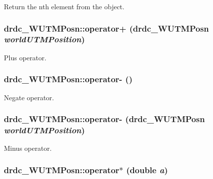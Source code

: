 Return the nth element from the object. 

\hypertarget{classdrdc__WUTMPosn_243334e7b04a731573a2d2fc875377b6}{
\subsubsection[operator+]{ drdc\_\-WUTMPosn::operator+ ({\bf drdc\_\-WUTMPosn} {\em worldUTMPosition})}}
\label{classdrdc__WUTMPosn_243334e7b04a731573a2d2fc875377b6}


Plus operator. 

\hypertarget{classdrdc__WUTMPosn_54f6cc02b2435080a081ad979cf36480}{
\subsubsection[operator-]{ drdc\_\-WUTMPosn::operator- ()}}
\label{classdrdc__WUTMPosn_54f6cc02b2435080a081ad979cf36480}


Negate operator. 

\hypertarget{classdrdc__WUTMPosn_94275ec1d96ae6a0e1740346e79c6a14}{
\subsubsection[operator-]{ drdc\_\-WUTMPosn::operator- ({\bf drdc\_\-WUTMPosn} {\em worldUTMPosition})}}
\label{classdrdc__WUTMPosn_94275ec1d96ae6a0e1740346e79c6a14}


Minus operator. 

\hypertarget{classdrdc__WUTMPosn_40f35ee9635745a294b204d70364a886}{
\subsubsection[operator$\ast$]{ drdc\_\-WUTMPosn::operator$\ast$ (double {\em a})}}
\label{classdrdc__WUTMPosn_40f35ee9635745a294b204d70364a886}



